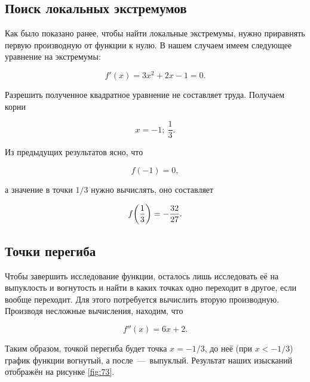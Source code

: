 \documentclass[12pt]{article}
\begin{document}
\subsection{Поиск локальных экстремумов} %
Как было показано ранее, чтобы найти локальные экстремумы, нужно приравнять первую производную от функции к нулю. В нашем случаем имеем следующее уравнение на экстремумы:

\begin{equation}
	f'(x) = 3x^2 +2x - 1 = 0.
\end{equation}

Разрешить полученное квадратное уравнение не составляет труда. Получаем корни 

\begin{equation}
	x = -1;\ \dfrac{1}{3}. 
\end{equation}

Из предыдущих результатов ясно, что 

\begin{equation}
	f(-1) = 0,
\end{equation}

а значение в точки $1/3$ нужно вычислять, оно составляет

\begin{equation}
	f\qty(\dfrac{1}{3}) = -\dfrac{32}{27}.
\end{equation}

\subsection{Точки перегиба} %
\label{sec:53}
Чтобы завершить исследование функции, осталось лишь исследовать её на выпуклость и вогнутость и найти в каких точках одно переходит в другое, если вообще переходит. Для этого потребуется вычислить вторую производную. Производя несложные вычисления, находим, что 

\begin{equation}
	f''(x) = 6x + 2.
\end{equation}

Таким образом, точкой перегиба будет точка $x = -1/3$, до неё (при $x< -1/3$) график функции вогнутый, а после~\----~выпуклый. Результат наших изысканий отображён на рисунке \ref{fig:73}.
\end{document}
